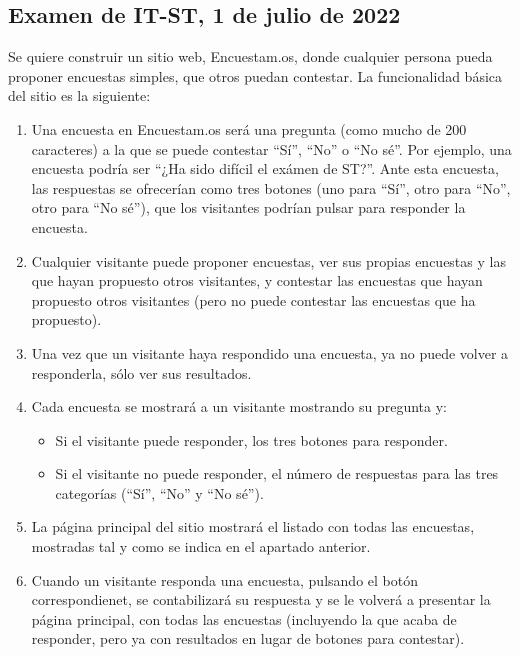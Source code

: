 \subsection{Examen de IT-ST, 1 de julio de 2022}


Se quiere construir un sitio web, Encuestam.os, donde cualquier persona pueda proponer encuestas simples, que otros puedan contestar. La funcionalidad básica del sitio es la siguiente:

\begin{enumerate}
\item Una encuesta en Encuestam.os será una pregunta (como mucho de 200 caracteres) a la que se puede contestar ``Sí'', ``No'' o ``No sé''. Por ejemplo, una encuesta podría ser ``¿Ha sido difícil el exámen de ST?''. Ante esta encuesta, las respuestas se ofrecerían como tres botones (uno para ``Sí'', otro para ``No'', otro para ``No sé''), que los visitantes podrían pulsar para responder la encuesta.
  
\item Cualquier visitante puede proponer encuestas, ver sus propias encuestas y las que hayan propuesto otros visitantes, y contestar las encuestas que hayan propuesto otros visitantes (pero no puede contestar las encuestas que ha propuesto).

\item Una vez que un visitante haya respondido una encuesta, ya no puede volver a responderla, sólo ver sus resultados.

\item Cada encuesta se mostrará a un visitante mostrando su pregunta y:
  \begin{itemize}
  \item Si el visitante puede responder, los tres botones para responder.
  \item Si el visitante no puede responder, el número de respuestas para las tres categorías (``Sí'', ``No'' y ``No sé'').
  \end{itemize}
  
\item La página principal del sitio mostrará el listado con todas las encuestas, mostradas tal y como se indica en el apartado anterior.

\item Cuando un visitante responda una encuesta, pulsando el botón correspondienet, se contabilizará su respuesta y se le volverá a presentar la página principal, con todas las encuestas (incluyendo la que acaba de responder, pero ya con resultados en lugar de botones para contestar).


\end{enumerate}
